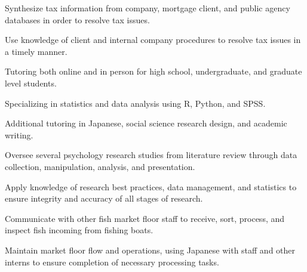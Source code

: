 \documentclass[letterpaper]{deedy-resume_sm} %
\begin{document}
\vspace{\topsep} %
\begin{tightitemize}
\item Synthesize tax information from company, mortgage client, and public agency databases in order to resolve tax issues.
\item Use knowledge of client and internal company procedures to resolve tax issues in a timely manner.
\end{tightitemize}
\sectionspace %
\vspace{\topsep} %
\begin{tightitemize}
\item Tutoring both online and in person for high school, undergraduate, and graduate level students.
\item Specializing in statistics and data analysis using R, Python, and SPSS.
\item Additional tutoring in Japanese, social science research design, and academic writing.
\end{tightitemize}
\sectionspace %
\vspace{\topsep} %
\begin{tightitemize}
\item Oversee several psychology research studies from literature review through data collection, manipulation, analysis, and presentation. 
\item Apply knowledge of research best practices, data management, and statistics to ensure integrity and accuracy of all stages of research.
\end{tightitemize}
\sectionspace %
\vspace{\topsep} %
\begin{tightitemize}
\item Communicate with other fish market floor staff to receive, sort, process, and inspect fish incoming from fishing boats. 
\item Maintain market floor flow and operations, using Japanese with staff and other interns to ensure completion of necessary processing tasks.
\end{tightitemize}
\sectionspace %
\end{document}
